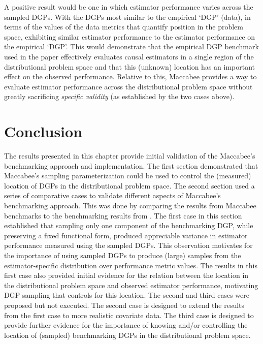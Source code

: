 \documentclass[../main.tex]{subfiles}
\begin{document}
A positive result would be one in which estimator performance varies across the sampled DGPs. With the DGPs most similar to the empirical `DGP' (data), in terms of the values of the data metrics that quantify position in the problem space, exhibiting similar estimator performance to the estimator performance on the empirical `DGP'. This would demonstrate that the empirical DGP benchmark used in the paper effectively evaluates causal estimators in a single region of the distributional problem space and that this (unknown) location has an important effect on the observed performance. Relative to this, Maccabee provides a way to evaluate estimator performance across the distributional problem space without greatly sacrificing \textit{specific validity} (as established by the two cases above).

\section{Conclusion}

The results presented in this chapter provide initial validation of the Maccabee's benchmarking approach and implementation. The first section demonstrated that Maccabee's sampling parameterization could be used to control the (measured) location of DGPs in the distributional problem space. The second section used a series of comparative cases to validate different aspects of Maccabee's benchmarking approach. This was done by comparing the results from Maccabee benchmarks to the benchmarking results from \textcite{Diamond2013GeneticStudies}. The first case in this section established that sampling only one component of the benchmarking DGP, while preserving a fixed functional form, produced appreciable variance in estimator performance measured using the sampled DGPs. This observation motivates for the importance of using sampled DGPs to produce (large) samples from the estimator-specific distribution over performance metric values. The results in this first case also provided initial evidence for the relation between the location in the distributional problem space and observed estimator performance, motivating DGP sampling that controls for this location. The second and third cases were proposed but not executed. The second case is designed to extend the results from the first case to more realistic covariate data. The third case is designed to provide further evidence for the importance of knowing and/or controlling the location of (sampled) benchmarking DGPs in the distributional problem space.
\end{document}
